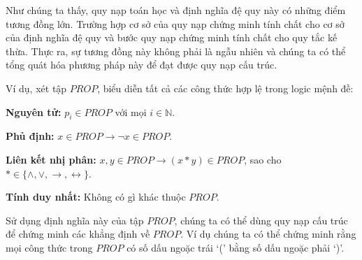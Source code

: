 \medskip
Như chúng ta thấy, quy nạp toán học và định nghĩa đệ quy này có những điểm tương đồng lớn. Trường hợp cơ sở của quy nạp chứng minh tính chất cho cơ sở của định nghĩa đệ quy và bước quy nạp chứng minh tính chất cho quy tắc kế thừa. Thực ra, sự tương đồng này không phải là ngẫu nhiên và chúng ta có thể tổng quát hóa phương pháp này để đạt được quy nạp cấu trúc.

Ví dụ, xét tập $PROP$, biểu diễn tất cả các công thức hợp lệ trong logic mệnh đề:

\medskip
\noindent\textbf{Nguyên tử:} $p_i \in PROP$ với mọi $i \in \mathbb{N}$.

\noindent\textbf{Phủ định:} $x \in PROP \to \neg x \in PROP$.

\noindent\textbf{Liên kết nhị phân:} $x, y \in PROP \to (x \ast y) \in PROP$, sao cho $\ast \in \{\land, \lor, \to, \leftrightarrow\}$.

\noindent\textbf{Tính duy nhất:} Không có gì khác thuộc $PROP$.

\medskip
Sử dụng định nghĩa này của tập $PROP$, chúng ta có thể dùng quy nạp cấu trúc để chứng minh các khẳng định về $PROP$. Ví dụ chúng ta có thể chứng minh rằng mọi công thức trong $PROP$ có số dấu ngoặc trái `(' bằng số dấu ngoặc phải `)'.

